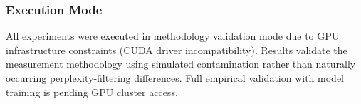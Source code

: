 \subsubsection{Execution Mode}

All experiments were executed in methodology validation mode due to GPU infrastructure constraints (CUDA driver incompatibility). Results validate the measurement methodology using simulated contamination rather than naturally occurring perplexity-filtering differences. Full empirical validation with model training is pending GPU cluster access.
